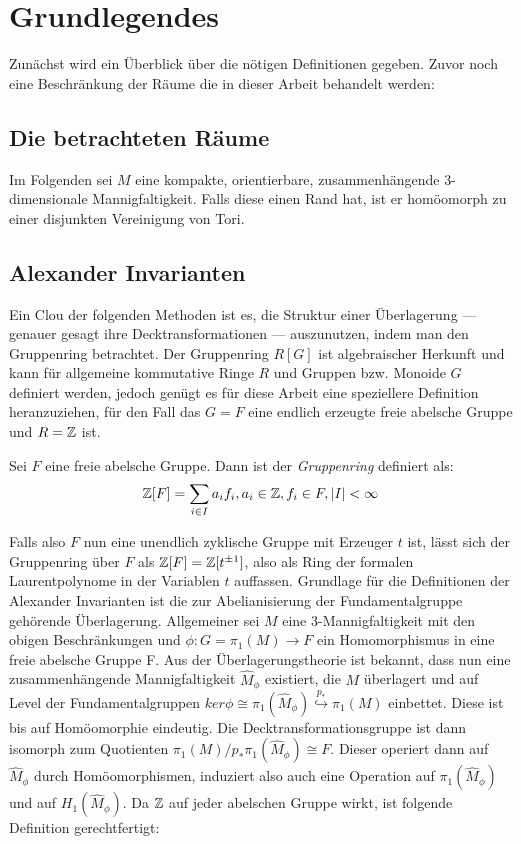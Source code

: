 \section{Grundlegendes}
    Zunächst wird ein Überblick über die nötigen Definitionen gegeben. Zuvor noch eine Beschränkung der Räume die in dieser Arbeit behandelt werden:


    \subsection{Die betrachteten Räume}
        Im Folgenden sei $M$ eine kompakte, orientierbare, zusammenhängende $3$-dimensionale Mannigfaltigkeit. Falls diese einen Rand hat, ist er homöomorph zu einer disjunkten Vereinigung von Tori.


    \subsection{Alexander Invarianten}
    	Ein Clou der folgenden Methoden ist es, die Struktur einer Überlagerung --- genauer gesagt ihre Decktransformationen --- auszunutzen, indem man den Gruppenring betrachtet. Der Gruppenring $R[G]$ ist algebraischer Herkunft und kann für allgemeine kommutative Ringe $R$ und Gruppen bzw. Monoide $G$ definiert werden, jedoch genügt es für diese Arbeit eine speziellere Definition heranzuziehen, für den Fall das $G=F$ eine endlich erzeugte freie abelsche Gruppe und $R=\mathbb{Z}$ ist.
    	\begin{defn}[Gruppenring]
    		Sei $F$ eine freie abelsche Gruppe. Dann ist der \textit{Gruppenring} definiert als:
    		\[
    			\mathbb{Z}[F] = \sum_{i \in I} a_i f_i, a_i \in \mathbb{Z}, f_i \in F, |I| < \infty
    		\]
    	\end{defn}
        \label{wirkung:gruppenring}
    	Falls also $F$ nun eine unendlich zyklische Gruppe mit Erzeuger $t$ ist, lässt sich der Gruppenring über $F$ als $\mathbb{Z}[F] = \mathbb{Z}[t^{\pm 1}]$, also als Ring der formalen Laurentpolynome in der Variablen $t$ auffassen. 
    	Grundlage für die Definitionen der Alexander Invarianten ist die zur Abelianisierung der Fundamentalgruppe gehörende Überlagerung. Allgemeiner sei $M$ eine 3-Mannigfaltigkeit mit den obigen Beschränkungen und $\phi: G=\pi_1(M) \to F$ ein Homomorphismus in eine freie abelsche Gruppe F. Aus der Überlagerungstheorie ist bekannt, dass nun eine zusammenhängende Mannigfaltigkeit $\hat M_\phi$ existiert, die $M$ überlagert und auf Level der Fundamentalgruppen $ker \phi \cong \pi_1 (\hat M_\phi) \stackrel{p_*}{\hookrightarrow} \pi_1(M)$ einbettet. Diese ist bis auf Homöomorphie eindeutig. Die Decktransformationsgruppe ist dann isomorph zum Quotienten $\pi_1(M)/p_*\pi_1(\hat M_\phi) \cong F$. Dieser operiert dann auf $\hat M_\phi$ durch Homöomorphismen, induziert also auch eine Operation auf $\pi_1(\hat M_\phi)$ und auf $H_1(\hat M_\phi)$. Da $\mathbb{Z}$ auf jeder abelschen Gruppe wirkt, ist folgende Definition gerechtfertigt:
